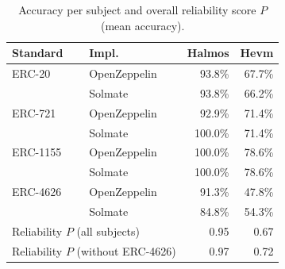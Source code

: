 \begin{table}[htbp]
\centering
\begin{scriptsize}
\begin{tabular}{llrr}
\toprule
\textbf{Standard} & \textbf{Impl.} & \textbf{Halmos} & \textbf{Hevm} \\
\midrule
ERC-20 & OpenZeppelin & 93.8\% & 67.7\% \\
 & Solmate & 93.8\% & 66.2\% \\
\addlinespace
ERC-721 & OpenZeppelin & 92.9\% & 71.4\% \\
 & Solmate & 100.0\% & 71.4\% \\
\addlinespace
ERC-1155 & OpenZeppelin & 100.0\% & 78.6\% \\
 & Solmate & 100.0\% & 78.6\% \\
\addlinespace
ERC-4626 & OpenZeppelin & 91.3\% & 47.8\% \\
 & Solmate & 84.8\% & 54.3\% \\
\midrule
\multicolumn{2}{l}{Reliability $P$ (all subjects)} & 0.95 & 0.67 \\
\multicolumn{2}{l}{Reliability $P$ (without ERC-4626)} & 0.97 & 0.72 \\
\bottomrule
\end{tabular}
\end{scriptsize}
\caption{Accuracy per subject and overall reliability score $P$ (mean accuracy).}
\label{tab:accuracy}
\end{table}
